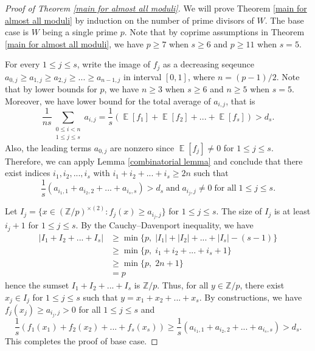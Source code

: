 \documentclass[11pt]{amsart}
\theoremstyle{plain} %
\theoremstyle{remark}
\numberwithin{equation}{section}
\newcommand{\E}{\mathop{\mathbb{E}}}
\newcommand{\Z}{\mathbb{Z}}
\begin{document}
\begin{proof}[Proof of Theorem \ref{main for almost all moduli}]
    We will prove Theorem \ref{main for almost all moduli} by induction on the number of prime divisors of $W$. The base case is $W$ being a single prime $p$. Note that by coprime assumptions in Theorem \ref{main for almost all moduli}, we have $p\geq 7$ when $s\geq 6$ and $p\geq 11$ when $s=5$.

    For every $1\leq j\leq s$, write the image of $f_j$ as a decreasing seqeunce $a_{0,j}\geq a_{1,j}\geq a_{2,j}\geq ...\geq a_{n-1,j}$ in interval $[0,1]$, where $n=(p-1)/2$. Note that by lower bounds for $p$, we have $n\geq 3$ when $s\geq 6$ and $n\geq 5$ when $s=5$. Moreover, we have lower bound for the total average of $a_{i,j}$, that is
    \begin{equation*}
        \frac{1}{ns}\sum_{\substack{0\leq i<n\\1\leq j\leq s}}a_{i,j}=\frac{1}{s}(\E[f_1]+\E[f_2]+...+\E[f_s])>d_s.
    \end{equation*}
    Also, the leading terms $a_{0,j}$ are nonzero since $\E[f_j]\neq 0$ for $1\leq j\leq s$. Therefore, we can apply Lemma \ref{combinatorial lemma} and conclude that there exist indices $i_1,i_2,...,i_s$ with $i_1+i_2+...+i_s\geq 2n$ such that
    \begin{equation*}
        \frac{1}{s}(a_{i_1,1}+a_{i_2,2}+...+a_{i_s,s})>d_s\;\text{and}\;a_{i_j,j}\neq 0\;\text{for all}\;1\leq j\leq s.
    \end{equation*}

    Let $I_j=\{x\in(\Z/p)^{\times(2)}:f_j(x)\geq a_{i_j,j}\}$ for $1\leq j\leq s$. The size of $I_j$ is at least $i_j+1$ for $1\leq j\leq s$. By the Cauchy--Davenport inequality, we have
    \begin{equation*}
        \begin{split}
            |I_1+I_2+...+I_s|&\geq \min\{p,\;|I_1|+|I_2|+...+|I_s|-(s-1)\}\\
            &\geq \min\{p,\;i_1+i_2+...+i_s+1\}\\
            &\geq \min\{p,\;2n+1\}\\
            &=p
        \end{split}
    \end{equation*}
    hence the sumset $I_1+I_2+...+I_s$ is $\Z/p$. Thus, for all $y\in\Z/p$, there exist $x_j\in I_j$ for $1\leq j\leq s$ such that $y=x_1+x_2+...+x_s$. By constructions, we have $f_j(x_j)\geq a_{i_j,j}>0$ for all $1\leq j\leq s$ and
    \begin{equation*}
        \frac{1}{s}(f_1(x_1)+f_2(x_2)+...+f_s(x_s))\geq \frac{1}{s}(a_{i_1,1}+a_{i_2,2}+...+a_{i_s,s})>d_s.
    \end{equation*}
    This completes the proof of base case.


\end{proof}
\end{document}
